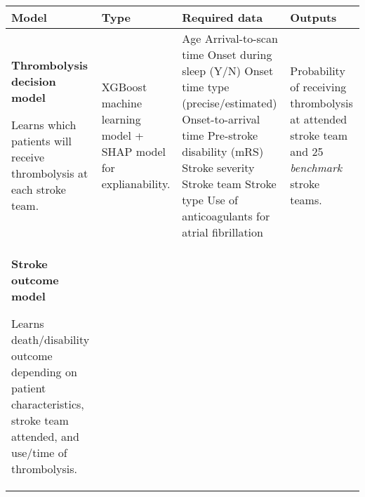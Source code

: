 \begin{landscape}
{
\RaggedRight
\begin{table}
\small
\raggedright
\begin{tabular}{|p{5cm}|p{5cm}|p{6cm}|p{6cm}|}

\hline
\textbf{Model} &  \textbf{Type} & \textbf{Required data} & \textbf{Outputs} \\
\hline

\textbf{Thrombolysis decision model} 

\vspace{2mm}

Learns which patients will receive thrombolysis at each stroke team. & 

XGBoost machine learning model + SHAP model for explianability. & 

Age\newline\vspace{3pt}
Arrival-to-scan time\newline\vspace{3pt}
Onset during sleep (Y/N)\newline\vspace{3pt}
Onset time type (precise/estimated)\newline\vspace{3pt}
Onset-to-arrival time\newline\vspace{3pt}
Pre-stroke disability (mRS)\newline\vspace{3pt}
Stroke severity\newline\vspace{3pt}
Stroke team\newline\vspace{3pt}
Stroke type\newline\vspace{3pt}
Use of anticoagulants for atrial fibrillation & 

Probability of receiving thrombolysis at attended stroke team and 25 \textit{benchmark} stroke teams. \\

\hline


\textbf{Stroke outcome model}

\vspace{3mm}

Learns death/disability outcome depending on patient characteristics, stroke team attended, and use/time of thrombolysis. &


\end{tabular}
\end{table}}
\end{landscape}
